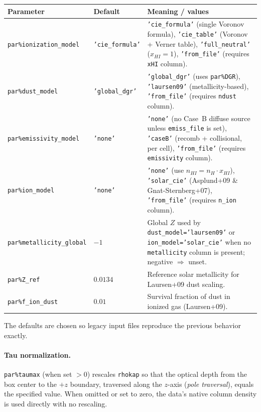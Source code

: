 \documentclass[english,a4paper]{my_memo}
\begin{document}
\begin{longtable}{p{} p{} p{}}
\toprule
Parameter & Default & Meaning / values \\
\midrule
\texttt{par\%ionization\_model} & \texttt{'cie\_formula'} &
  \texttt{'cie\_formula'} (single Voronov formula),
  \texttt{'cie\_table'} (Voronov + Verner table),
  \texttt{'full\_neutral'} ($x_{HI}=1$),
  \texttt{'from\_file'} (requires \texttt{xHI} column). \\
\texttt{par\%dust\_model} & \texttt{'global\_dgr'} &
  \texttt{'global\_dgr'} (uses \texttt{par\%DGR}),
  \texttt{'laursen09'} (metallicity-based),
  \texttt{'from\_file'} (requires \texttt{ndust} column). \\
\texttt{par\%emissivity\_model} & \texttt{'none'} &
  \texttt{'none'} (no Case~B diffuse source unless \texttt{emiss\_file} is
  set),
  \texttt{'caseB'} (recomb + collisional, per cell),
  \texttt{'from\_file'} (requires \texttt{emissivity} column). \\
\texttt{par\%ion\_model} & \texttt{'none'} &
  \texttt{'none'} (use $n_{HI}=n_H \cdot x_{HI}$),
  \texttt{'solar\_cie'} (Asplund+09 \& Gnat-Sternberg+07),
  \texttt{'from\_file'} (requires \texttt{n\_ion} column). \\
\texttt{par\%metallicity\_global} & $-1$ &
  Global $Z$ used by \texttt{dust\_model='laursen09'} or
  \texttt{ion\_model='solar\_cie'} when no \texttt{metallicity} column is
  present; negative $\Rightarrow$ unset. \\
\texttt{par\%Z\_ref} & $0.0134$ &
  Reference solar metallicity for Laursen+09 dust scaling. \\
\texttt{par\%f\_ion\_dust} & $0.01$ &
  Survival fraction of dust in ionized gas (Laursen+09). \\
\bottomrule
\end{longtable}

The defaults are chosen so legacy input files reproduce the previous
behavior exactly.

\paragraph{Tau normalization.}
\texttt{par\%taumax} (when set $>0$) rescales \texttt{rhokap} so that the
optical depth from the box center to the $+z$ boundary, traversed along
the $z$-axis (\emph{pole traversal}), equals the specified value.  When
omitted or set to zero, the data's native column density is used directly
with no rescaling.
\end{document}
